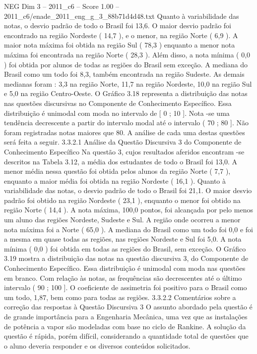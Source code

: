 \begin{textsample}{NEG Dim 3 – 2011\_c6 – Score 1.00 – 2011\_c6/enade\_2011\_eng\_g\_3\_88b71d4d48.txt}
Quanto à variabilidade das notas, o desvio padrão de todo o Brasil foi 13,6.
O maior desvio padrão foi encontrado na região Nordeste ( 14,7 ), e o menor, na região Norte ( 6,9 ).
A maior nota máxima foi obtida na região Sul ( 78,3 ) enquanto a menor nota máxima foi encontrada na região Norte ( 28,3 ).
Além disso, a nota mínima ( 0,0 ) foi obtida por alunos de todas as regiões do Brasil sem exceção.
A mediana do Brasil como um todo foi 8,3, também encontrada na região Sudeste.
As demais medianas foram : 3,3 na região Norte, 11,7 na região Nordeste, 10,0 na região Sul e 5,0 na região Centro-Oeste.
O Gráfico 3.18 representa a distribuição das notas nas questões discursivas no Componente de Conhecimento Específico.
Essa distribuição é unimodal com moda no intervalo de [ 0 ; 10 ].
Nota -se uma tendência decrescente a partir do intervalo modal até o intervalo ( 70 ; 80 ].
Não foram registradas notas maiores que 80.
A análise de cada uma destas questões será feita a seguir. 3.3.2.1 Análise da Questão Discursiva 3 do Componente de Conhecimento Específico Na questão 3, cujos resultados aferidos encontram -se descritos na Tabela 3.12, a média dos estudantes de todo o Brasil foi 13,0.
A menor média nessa questão foi obtida pelos alunos da região Norte ( 7,7 ), enquanto a maior média foi obtida na região Nordeste ( 16,1 ).
Quanto à variabilidade das notas, o desvio padrão de todo o Brasil foi 21,1.
O maior desvio padrão foi obtido na região Nordeste ( 23,1 ), enquanto o menor foi obtido na região Norte ( 14,4 ).
A nota máxima, 100,0 pontos, foi alcançada por pelo menos um aluno das regiões Nordeste, Sudeste e Sul.
A região onde ocorreu a menor nota máxima foi a Norte ( 65,0 ).
A mediana do Brasil como um todo foi 0,0 e foi a mesma em quase todas as regiões, nas regiões Nordeste e Sul foi 5,0.
A nota mínima ( 0,0 ) foi obtida em todas as regiões do Brasil, sem exceção.
O Gráfico 3.19 mostra a distribuição das notas na questão discursiva 3, do Componente de Conhecimento Específico.
Essa distribuição é unimodal com moda nas questões em branco.
Com relação às notas, as frequências são decrescentes até o último intervalo ( 90 ; 100 ].
O coeficiente de assimetria foi positivo para o Brasil como um todo, 1,87, bem como para todas as regiões. 3.3.2.2 Comentários sobre a correção das respostas à Questão Discursiva 3 O assunto abordado pela questão é de grande importância para a Engenharia Mecânica, uma vez que as instalações de potência a vapor são modeladas com base no ciclo de Rankine.
A solução da questão é rápida, porém difícil, considerando a quantidade total de questões que o aluno deveria responder e os diversos conteúdos solicitados.

\end{textsample}
